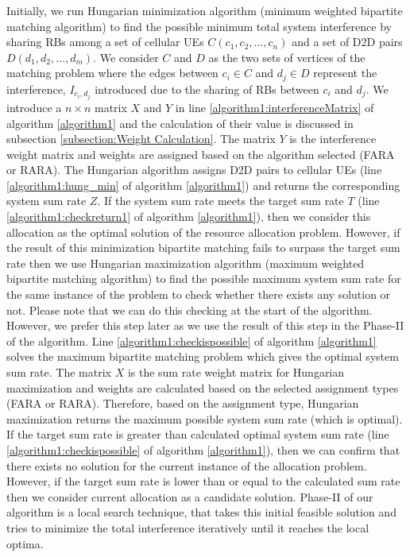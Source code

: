 \documentclass{ieeeaccess}
\begin{document}
Initially, we run Hungarian minimization algorithm \cite{hungarian} (minimum weighted bipartite matching algorithm) to find the possible minimum total system interference by sharing RBs among a set of cellular UEs $C(c_1,c_2,\ldots, c_n)$ and a set of D2D pairs $D(d_1,d_2,\ldots,d_m)$. We consider $C$ and $D$ as the two sets of vertices of the matching problem where the edges between $c_i \in C $ and $d_j \in D$ represent the interference, $I_{c_i,d_j}$ introduced due to the sharing of RBs between $c_i$ and $d_j$. We introduce a $n \times n$ matrix $X$ and $Y$ in line \ref{algorithm1:interferenceMatrix} of algorithm \ref{algorithm1} and the calculation of their value is discussed in subsection \ref{subsection:Weight Calculation}. The matrix $Y$ is the interference weight matrix and weights are assigned based on the algorithm selected (FARA or RARA). The Hungarian algorithm assigns D2D pairs to cellular UEs (line \ref{algorithm1:hung_min} of algorithm \ref{algorithm1}) and returns the corresponding system sum rate $Z$. If the system sum rate meets the target sum rate $T$ (line \ref{algorithm1:checkreturn1} of algorithm \ref{algorithm1}), then we consider this allocation as the optimal solution of the resource allocation problem. However, if the result of this minimization bipartite matching fails to surpass the target sum rate then we use Hungarian maximization algorithm (maximum weighted bipartite matching algorithm) to find the possible maximum system sum rate for the same instance of the problem to check whether there exists any solution or not.  Please note that we can do this checking at the start of the algorithm. However, we prefer this step later as we use the result of this step in the Phase-II of the algorithm. Line \ref{algorithm1:checkispossible} of algorithm \ref{algorithm1} solves the maximum bipartite matching problem which gives the optimal system sum rate. The matrix $X$ is the sum rate weight matrix for Hungarian maximization and weights are calculated based on the selected assignment types (FARA or RARA). Therefore, based on the assignment type, Hungarian maximization returns the maximum possible system sum rate (which is optimal). If the target sum rate is greater than calculated optimal system sum rate (line \ref{algorithm1:checkispossible} of algorithm \ref{algorithm1}), then we can confirm that there exists no solution for the current instance of the allocation problem. However, if the target sum rate is lower than or equal to the calculated sum rate then we consider current allocation as a candidate solution.  Phase-II of our algorithm is a local search technique, that takes this initial feasible solution and tries to minimize the total interference iteratively until it reaches the local optima. 
\end{document}
